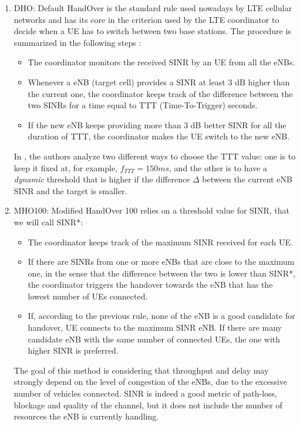 \documentclass[conference,10pt]{IEEEtran}
\begin{document}
\begin{enumerate}
\item DHO: Default HandOver is the standard rule used nowadays by LTE cellular networks and has its core in the criterion used by the LTE coordinator to decide when a UE has to switch between two base stations. The procedure is summarized in the following steps \cite{imphand}:

\begin{itemize}
	\item The coordinator monitors the received SINR by an UE from all the eNBs.
	\item Whenever a eNB (target cell) provides a SINR at least 3 dB higher than the current one, the coordinator keeps track of the difference between the two SINRs for a time equal to TTT (Time-To-Trigger) seconds.
	\item If the new eNB keeps providing more than 3 dB better SINR for all the duration of TTT, the coordinator makes the UE switch to the new eNB.
\end{itemize}

In \cite{imphand}, the authors analyze two different ways to choose the TTT value: one is to keep it fixed at, for example, $f_{TTT}=150ms$, and the other is to have a \emph{dynamic} threshold that is higher if the difference $\Delta$ between the current eNB SINR and the target is smaller. 

\item MHO100:
Modified HandOver 100 relies on a threshold value for SINR, that we will call SINR*:

\begin{itemize}
	\item The coordinator keeps track of the maximum SINR received for each UE.
	\item If there are SINRs from one or more eNBs that are close to the maximum one, in the sense that the difference between the two is lower than SINR*, the coordinator triggers the handover towards the eNB that has the lowest number of UEs connected.
	\item If, according to the previous rule, none of the eNB is a good candidate for handover, UE connects to the maximum SINR eNB.
	If there are many candidate eNB with the same number of connected UEs, the one with higher SINR is preferred.
\end{itemize}

The goal of this method is considering that throughput and delay may strongly depend on the level of congestion of the eNBs, due to the excessive number of vehicles connected. SINR is indeed a good metric of path-loss, blockage and quality of the channel, but it does not include the number of resources the eNB is currently handling.


\end{enumerate}
\end{document}
